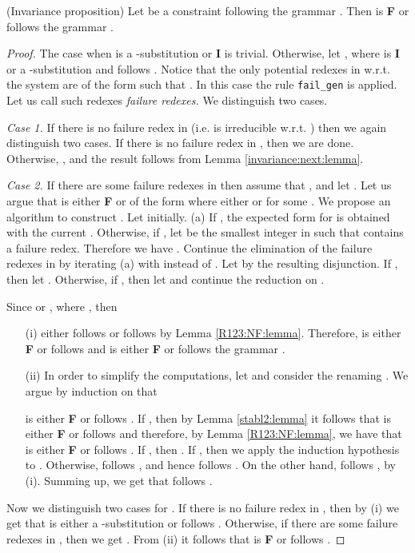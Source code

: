 \documentclass[submission,copyright,creativecommons]{eptcs}
\numberwithin{subcase}{case}
\begin{document}
\begin{proposition}(Invariance proposition)
\label{inviariance:FN:prop}
Let  be a constraint following the grammar .
  Then 
  		\linebreak
   is \textbf{F} or follows the grammar 
.
\end{proposition}
\begin{proof}
The case when  is a -substitution or \textbf{I} is trivial.
Otherwise, let , where  is \textbf{I} or a
-substitution and  follows  .
Notice that the only potential redexes in   w.r.t. 
the system  are of the form
 such that 
. In this case the rule \texttt{fail\_gen} is
applied. Let us call such redexes \emph{failure redexes.}
We  distinguish two cases. 

\noindent \textit{Case 1.} If there is no 
 failure redex in  (i.e.  is irreducible w.r.t. ) 
then we again distinguish two cases. 
If there is no failure redex in , then we are done.
Otherwise, 
,
and the result follows from Lemma \ref{invariance:next:lemma}.

\noindent \textit{Case 2.} If there are some failure redexes in  then assume
that , and let . Let us argue  that
  is either \textbf{F} or of the form  where either  or  for some . We propose an algorithm to construct
. Let  initially. (a) If , the expected form for
 is obtained with the current . Otherwise, if , let
 be the smallest integer in  such that  contains a failure redex.
Therefore we have .
Continue the elimination of the failure redexes in  by
iterating (a) with  instead of . Let  by the
resulting disjunction. If , then
let . Otherwise, if
, then let
 and continue the reduction on
 . 

Since   or , where ,
then  
\begin{enumerate}
  \item[(i)] 
  either follows  or
 follows  by   Lemma \ref{R123:NF:lemma}. 
Therefore,  is either 
\textbf{F} or follows  and  is either \textbf{F} or follows the grammar 
. 
\item[(ii)] In order to simplify the computations,  
let   and consider the renaming 
. 
We argue by induction on  that 
 
is either \textbf{F} or follows . 
If , then by Lemma \ref{stabl2:lemma} it follows that 
 is either \textbf{F} or 
 follows  and therefore, by Lemma \ref{R123:NF:lemma},
we have that  is either 
\textbf{F} or follows .
If , then 
.
If , then we apply the induction 
hypothesis to 
. Otherwise,
 follows , and hence 
 follows . On the other 
hand,  follows ,
by (i). Summing up, we get that  follows .
\end{enumerate}

Now we distinguish two cases for .  If there is no failure redex in
, then by (i) we get that 
is either a -substitution or follows . 
Otherwise, if there are some failure redexes in , then
 we get . From (ii)
it follows that  is  \textbf{F}
or follows .
 \end{proof}
\end{document}
